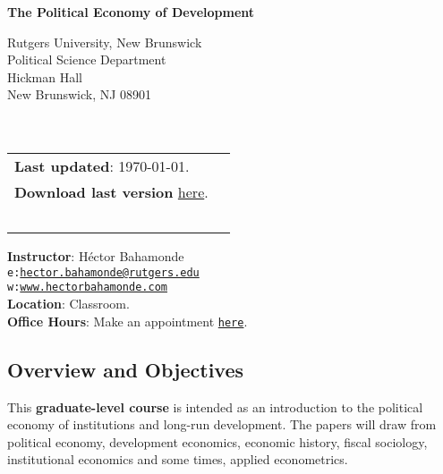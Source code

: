 \documentclass[letterpaper]{article}
\def\name{The Political Economy of Development}
\begin{document}

\centerline{\huge \bf \name}

\vspace{0.25in}

\begin{minipage}{0.45\linewidth}
  Rutgers University, New Brunswick \\
  Political Science Department \\
  Hickman Hall \\
  New Brunswick, NJ 08901\\
  \\
  \\

\end{minipage}
\hspace{4cm}\begin{minipage}{0.45\linewidth}
  \begin{tabular}{ll}
{\bf Last updated}: \today. \\
 {\bf Download last version} \href{https://github.com/hbahamonde/Pol_Econ_Dev_Grad/raw/master/Pol_Econ_Dev_Syllabus_GRAD.pdf}{here}.
    \\
    \\
    \\
    \\
    \\
    \\
  \end{tabular}
\end{minipage}

\vspace{-5mm}
{\bf Instructor}: H\'ector Bahamonde\\
\texttt{e:}\href{mailto:hector.bahamonde@rutgers.edu}{\texttt{hector.bahamonde@rutgers.edu}}\\
\texttt{w:}\href{http://www.hectorbahamonde.com}{\texttt{www.hectorbahamonde.com}}\\
{\bf Location}: Classroom.\\
{\bf Office Hours}: Make an appointment \href{https://calendly.com/bahamonde/officehours}{\texttt{here}}.

\subsection*{Overview and Objectives}

This {\bf {\color{blue}graduate-level course}} is intended as an introduction to the political economy of institutions and long-run development. The papers will draw from political economy, development economics, economic history, fiscal sociology, institutional economics and some times, applied econometrics. 
\end{document}
